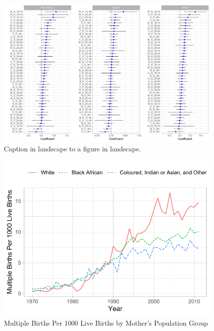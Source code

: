 \documentclass[11pt,a4paper]{article}
\begin{document}
\begin{figure}
\centering
\caption{\label{fig:03}Caption in landscape to a figure in landscape.}
\includegraphics[width=\textwidth]{figures/monot.pdf}
\end{figure}

\begin{figure}[h!]
\centering
\caption{\label{fig:04}Multiple Births Per 1000 Live Births by Mother's Population Group}
\includegraphics[width=\textwidth]{figures/line_pp.pdf}
\end{figure}
\end{document}
